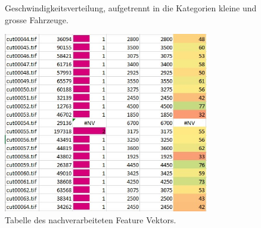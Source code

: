 \begin{figure}[H]
  \centering
  \caption{Geschwindigkeitsverteilung, aufgetrennt in die Kategorien kleine und grosse Fahrzeuge.}
  \label{bFrames}
\end{figure}

\begin{figure}[H]
  \centering
  \includegraphics[width=0.8\textwidth]{Resultate/Nachverarbeitung.jpg} 
  \caption{Tabelle des nachverarbeiteten Feature Vektors.}
  \label{bNachverarbeitung}
\end{figure}